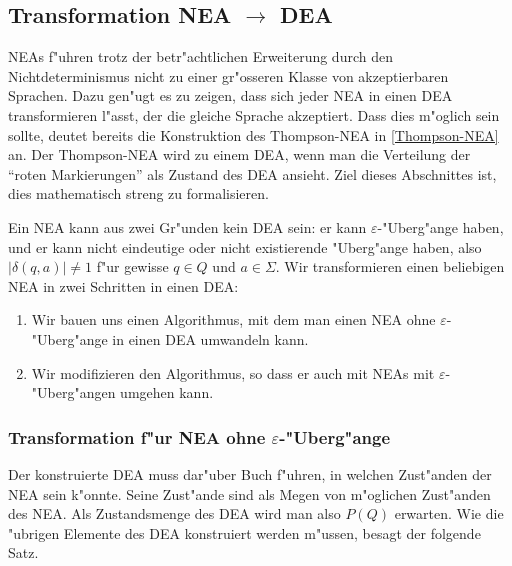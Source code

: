 \subsection{Transformation NEA $\rightarrow$ DEA\label{regulaer:nea-dea}}
NEAs f"uhren trotz der betr"achtlichen Erweiterung durch den
Nichtdeterminismus nicht zu einer gr"osseren Klasse von akzeptierbaren
Sprachen. Dazu gen"ugt es zu zeigen, dass sich jeder NEA in einen DEA
transformieren l"asst, der die gleiche Sprache akzeptiert.
Dass dies m"oglich sein sollte, deutet bereits die Konstruktion
des Thompson-NEA in \ref{Thompson-NEA} an. Der Thompson-NEA
wird zu einem DEA, wenn man die Verteilung der ``roten Markierungen''
als Zustand des DEA ansieht. Ziel dieses Abschnittes ist, dies
mathematisch streng zu formalisieren.

Ein NEA kann aus zwei Gr"unden kein DEA sein:
er kann $\varepsilon$-"Uberg"ange haben, und er kann nicht eindeutige
oder nicht existierende "Uberg"ange haben, also $|\delta(q,a)|\ne 1$
f"ur gewisse $q\in Q$ und $a\in\Sigma$.  Wir transformieren einen 
beliebigen NEA in zwei Schritten in einen DEA:
\begin{enumerate}
\item Wir bauen uns einen Algorithmus, mit dem man einen NEA ohne
$\varepsilon$-"Uberg"ange in einen DEA umwandeln kann.
\item Wir modifizieren den Algorithmus, so dass er auch mit NEAs mit
$\varepsilon$-"Uberg"angen umgehen kann.
\end{enumerate}

\subsubsection{Transformation f"ur NEA ohne $\varepsilon$-"Uberg"ange}
Der konstruierte DEA muss dar"uber Buch f"uhren, in welchen Zust"anden
der NEA sein k"onnte. Seine Zust"ande sind als Megen von m"oglichen
Zust"anden des NEA. Als Zustandsmenge des DEA wird man also $P(Q)$ 
erwarten. Wie die "ubrigen Elemente des DEA konstruiert werden m"ussen,
besagt der folgende Satz.

